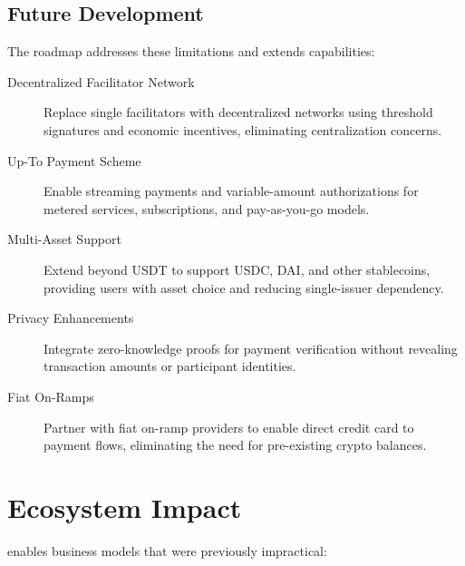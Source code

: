\subsection{Future Development}

The \tprotocol{} roadmap addresses these limitations and extends capabilities:

\begin{description}
    \item[Decentralized Facilitator Network] Replace single facilitators with decentralized networks using threshold signatures and economic incentives, eliminating centralization concerns.

    \item[Up-To Payment Scheme] Enable streaming payments and variable-amount authorizations for metered services, subscriptions, and pay-as-you-go models.

    \item[Multi-Asset Support] Extend beyond USDT to support USDC, DAI, and other stablecoins, providing users with asset choice and reducing single-issuer dependency.

    \item[Privacy Enhancements] Integrate zero-knowledge proofs for payment verification without revealing transaction amounts or participant identities.

    \item[Fiat On-Ramps] Partner with fiat on-ramp providers to enable direct credit card to \tprotocol{} payment flows, eliminating the need for pre-existing crypto balances.
\end{description}

\section{Ecosystem Impact}
\label{sec:ecosystem-impact}

\tprotocol{} enables business models that were previously impractical:

